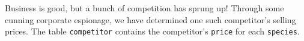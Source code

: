 Business is good, but a bunch of competition has sprung up! Through some cunning corporate espionage, we have determined one such competitor's selling prices. The table \lstinline$competitor$ contains the competitor's \lstinline$price$ for each \lstinline$species$.
